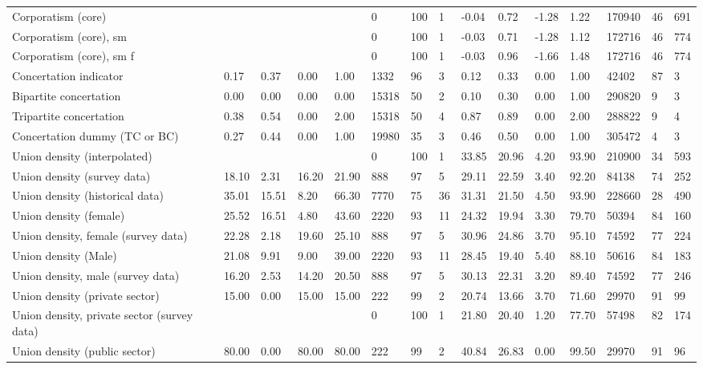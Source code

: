 \begin{longtable}{lllllllllllllll}
Corporatism (core) &  &  &  &  & 0 & 100 & 1 & -0.04 & 0.72 & -1.28 & 1.22 & 170940 & 46 & 691\\
\addlinespace
Corporatism (core), sm &  &  &  &  & 0 & 100 & 1 & -0.03 & 0.71 & -1.28 & 1.12 & 172716 & 46 & 774\\
Corporatism (core), sm f &  &  &  &  & 0 & 100 & 1 & -0.03 & 0.96 & -1.66 & 1.48 & 172716 & 46 & 774\\
Concertation indicator & 0.17 & 0.37 & 0.00 & 1.00 & 1332 & 96 & 3 & 0.12 & 0.33 & 0.00 & 1.00 & 42402 & 87 & 3\\
Bipartite concertation & 0.00 & 0.00 & 0.00 & 0.00 & 15318 & 50 & 2 & 0.10 & 0.30 & 0.00 & 1.00 & 290820 & 9 & 3\\
Tripartite concertation & 0.38 & 0.54 & 0.00 & 2.00 & 15318 & 50 & 4 & 0.87 & 0.89 & 0.00 & 2.00 & 288822 & 9 & 4\\
\addlinespace
Concertation dummy (TC or BC) & 0.27 & 0.44 & 0.00 & 1.00 & 19980 & 35 & 3 & 0.46 & 0.50 & 0.00 & 1.00 & 305472 & 4 & 3\\
Union density (interpolated) &  &  &  &  & 0 & 100 & 1 & 33.85 & 20.96 & 4.20 & 93.90 & 210900 & 34 & 593\\
Union density (survey data) & 18.10 & 2.31 & 16.20 & 21.90 & 888 & 97 & 5 & 29.11 & 22.59 & 3.40 & 92.20 & 84138 & 74 & 252\\
Union density (historical data) & 35.01 & 15.51 & 8.20 & 66.30 & 7770 & 75 & 36 & 31.31 & 21.50 & 4.50 & 93.90 & 228660 & 28 & 490\\
Union density (female) & 25.52 & 16.51 & 4.80 & 43.60 & 2220 & 93 & 11 & 24.32 & 19.94 & 3.30 & 79.70 & 50394 & 84 & 160\\
\addlinespace
Union density, female (survey data) & 22.28 & 2.18 & 19.60 & 25.10 & 888 & 97 & 5 & 30.96 & 24.86 & 3.70 & 95.10 & 74592 & 77 & 224\\
Union density (Male) & 21.08 & 9.91 & 9.00 & 39.00 & 2220 & 93 & 11 & 28.45 & 19.40 & 5.40 & 88.10 & 50616 & 84 & 183\\
Union density, male (survey data) & 16.20 & 2.53 & 14.20 & 20.50 & 888 & 97 & 5 & 30.13 & 22.31 & 3.20 & 89.40 & 74592 & 77 & 246\\
Union density (private sector) & 15.00 & 0.00 & 15.00 & 15.00 & 222 & 99 & 2 & 20.74 & 13.66 & 3.70 & 71.60 & 29970 & 91 & 99\\
Union density, private sector (survey data) &  &  &  &  & 0 & 100 & 1 & 21.80 & 20.40 & 1.20 & 77.70 & 57498 & 82 & 174\\
\addlinespace
Union density (public sector) & 80.00 & 0.00 & 80.00 & 80.00 & 222 & 99 & 2 & 40.84 & 26.83 & 0.00 & 99.50 & 29970 & 91 & 96\\

\end{longtable}
